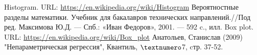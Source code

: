 \documentclass[main.tex]{subfiles}
\begin{document}
	\begin{thebibliography}{99}
		  Histogram. URL: \url{https://en.wikipedia.org/wiki/Histogram}
		  Вероятностные разделы математики. Учебник для бакалавров технических направлений.//Под ред. Максимова Ю.Д. — Спб.: «Иван Федоров», 2001. — 592 c., илл.
		  Box plot. URL: \url{https://en.wikipedia.org/wiki/Box_plot}
		  Анатольев, Станислав (2009) "Непараметрическая регрессия", Квантиль, $\textnumero$7, cтр. 37-52.
	\end{thebibliography}
\end{document}
